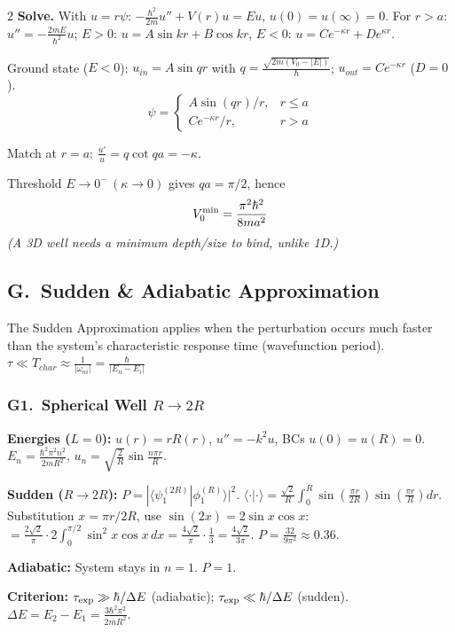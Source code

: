 \documentclass[9pt,a4paper]{article} %
\begin{document}
\begin{multicols}{2}
\textbf{Solve.} With $u=r\psi$: 
$-\frac{\hbar^2}{2m}u''+V(r)u=Eu$, $u(0)=u(\infty)=0$. 
For $r>a$: $u''=-\frac{2mE}{\hbar^2}u$;
$E>0:\,u=A\sin kr+B\cos kr$, $E<0:\,u=Ce^{-\kappa r}+De^{\kappa r}$.

Ground state ($E<0$): 
$u_{in}=A\sin qr$ with $q=\frac{\sqrt{2m(V_0-|E|)}}{\hbar}$; 
$u_{out}=Ce^{-\kappa r}$ ($D=0$). 
$$\psi=\begin{cases}A\sin(qr)/r,&r\le a\\C e^{-\kappa r}/r,&r>a\end{cases}$$

Match at $r=a$: $\frac{u'}{u}=q\cot qa=-\kappa$.

Threshold $E\to0^-\,(\kappa\to0)$ gives $qa=\pi/2$, hence
$$V_0^{\min}={\pi^2\hbar^2\over8ma^2}$$ 
\textit{\footnotesize(A 3D well needs a minimum depth/size to bind, unlike 1D.)}

\subsection{G.\ Sudden \& Adiabatic Approximation}
The Sudden Approximation applies when the perturbation occurs much faster than the system’s characteristic response time (wavefunction period).
\\$\tau \ll T_{char} \approx \frac{1}{|\omega_{ni}|} = \frac{\hbar}{|E_n - E_i|}$
\subsubsection{G1.\ Spherical Well $R\to 2R$}
\textbf{Energies ($L=0$):}
$u(r)=rR(r)$, $u''=-k^2 u$, BCs $u(0)=u(R)=0$.
$E_n=\frac{\hbar^2\pi^2 n^2}{2mR^2}$,\; $u_n=\sqrt{\frac{2}{R}}\sin\frac{n\pi r}{R}$.

\textbf{Sudden ($R\to 2R$):}
$P=|\langle\psi_1^{(2R)}|\phi_1^{(R)}\rangle|^2$.
$\langle\cdot|\cdot\rangle=\frac{\sqrt{2}}{R}\int_0^R\sin(\frac{\pi r}{2R})\sin(\frac{\pi r}{R})dr$.
Substitution $x=\pi r/2R$, use $\sin(2x)=2\sin x\cos x$:
$=\frac{2\sqrt{2}}{\pi}\cdot 2\int_0^{\pi/2}\sin^2 x\cos x\,dx=\frac{4\sqrt{2}}{\pi}\cdot\frac{1}{3}=\frac{4\sqrt{2}}{3\pi}$.
$\boxed{P=\frac{32}{9\pi^2}\approx 0.36}$.

\textbf{Adiabatic:} System stays in $n=1$.\; $P=1$.

\textbf{Criterion:} $\tau_{\rm exp}\gg\hbar/\Delta E$ (adiabatic);\; $\tau_{\rm exp}\ll\hbar/\Delta E$ (sudden).
$\Delta E=E_2-E_1=\frac{3\hbar^2\pi^2}{2mR^2}$.


\end{multicols}
\end{document}
